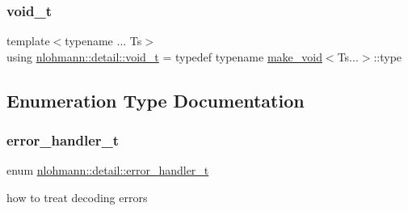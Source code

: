 \mbox{\label{namespacenlohmann_1_1detail_a92a167c49c6697b6ffe4f79492c705e5}} 
\subsubsection{\texorpdfstring{void\+\_\+t}{void\_t}}
{\footnotesize\ttfamily template$<$typename ... Ts$>$ \\
using \hyperlink{namespacenlohmann_1_1detail_a92a167c49c6697b6ffe4f79492c705e5}{nlohmann\+::detail\+::void\+\_\+t} = typedef typename \hyperlink{structnlohmann_1_1detail_1_1make__void}{make\+\_\+void}$<$Ts...$>$\+::type}



\subsection{Enumeration Type Documentation}
\mbox{\label{namespacenlohmann_1_1detail_a5a76b60b26dc8c47256a996d18d967df}} 
\subsubsection{\texorpdfstring{error\+\_\+handler\+\_\+t}{error\_handler\_t}}
{\footnotesize\ttfamily enum \hyperlink{namespacenlohmann_1_1detail_a5a76b60b26dc8c47256a996d18d967df}{nlohmann\+::detail\+::error\+\_\+handler\+\_\+t}\hspace{0.3cm}{\ttfamily [strong]}}



how to treat decoding errors 

